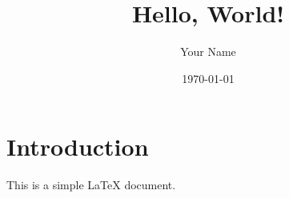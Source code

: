 \documentclass{article}
\begin{document}
\title{Hello, World!}
\author{Your Name}
\date{\today}

\maketitle

\section{Introduction}

This is a simple LaTeX document.
\end{document}
